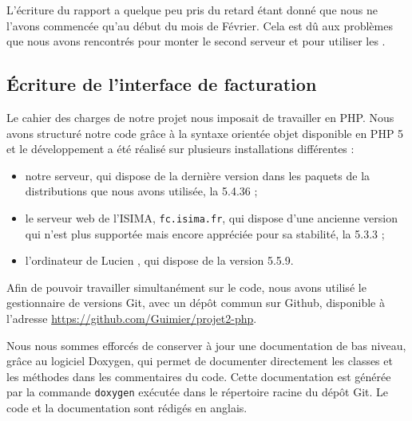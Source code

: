 L'écriture du rapport a quelque peu pris du retard étant donné que nous ne l'avons commencée qu'au début du mois de Février. Cela est dû aux problèmes que nous avons rencontrés pour monter le second serveur et pour utiliser les {\cph}.


\subsection{Écriture de l’interface de facturation}

Le cahier des charges de notre projet nous imposait de travailler en PHP. Nous avons structuré notre code grâce à la syntaxe orientée objet disponible en PHP 5 et le développement a été réalisé sur plusieurs installations différentes :
\begin{itemize}
	\item notre serveur, qui dispose de la dernière version dans les paquets de la distributions que nous avons utilisée, la 5.4.36 ;
	\item le serveur web de l’ISIMA, \texttt{fc.isima.fr}, qui dispose d’une ancienne version qui n’est plus supportée mais encore appréciée pour sa stabilité, la 5.3.3 ;
	\item l’ordinateur de Lucien , qui dispose de la version 5.5.9.
\end{itemize}

Afin de pouvoir travailler simultanément sur le code, nous avons utilisé le gestionnaire de versions Git, avec un dépôt commun sur Github, disponible à l’adresse \url{https://github.com/Guimier/projet2-php}.

Nous nous sommes efforcés de conserver à jour une documentation de bas niveau, grâce au logiciel Doxygen, qui permet de documenter directement les classes et les méthodes dans les commentaires du code. Cette documentation est générée par la commande \texttt{doxygen} exécutée dans le répertoire racine du dépôt Git. Le code et la documentation sont rédigés en anglais.
